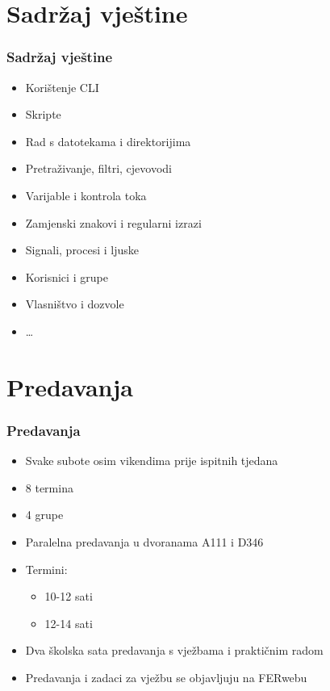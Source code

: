 \documentclass{beamer}
\begin{document}
\section{Sadržaj vještine}
\begin{frame}[t]
	\frametitle{Sadržaj vještine}
	\begin{itemize}
		\item Korištenje CLI
		\item Skripte
		\item Rad s datotekama i direktorijima
		\item Pretraživanje, filtri, cjevovodi
		\item Varijable i kontrola toka
		\item Zamjenski znakovi i regularni izrazi
		\item Signali, procesi i ljuske
		\item Korisnici i grupe
		\item Vlasništvo i dozvole
		\item \ldots
	\end{itemize}
\end{frame}

\section{Predavanja}
\begin{frame}[t]
\frametitle{Predavanja}
\begin{itemize}
	\item Svake subote osim vikendima prije ispitnih tjedana
	\item 8 termina
	\item 4 grupe
	\item Paralelna predavanja u dvoranama A111 i D346
	\item Termini:
	\begin{itemize}
		\item 10-12 sati
		\item 12-14 sati
	\end{itemize}
	\item Dva školska sata predavanja s vježbama i praktičnim radom
	\item Predavanja i zadaci za vježbu se objavljuju na FERwebu
\end{itemize}
\end{frame}
\end{document}

